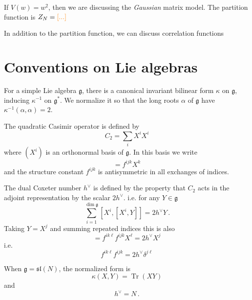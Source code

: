 \documentclass[12pt,letterpaper,reqno]{amsart}
\numberwithin{equation}{section}
\newcommand{\fg}{{\mathfrak g}}
\newcommand{\fsl}{{\mathfrak {sl}}}
\newcommand{\ti}[1]{\textit{#1}}
\DeclareMathOperator{\Tr}{Tr}
\DeclareRobustCommand{\fixme}[1]{\leavevmode{\color{orange}[#1]}}
\begin{document}
\begin{example} If $V(w) = w^2$, then we are discussing the \ti{Gaussian} matrix model.
The partition function is $Z_N = \fixme{...}$
\end{example}

In addition to the partition function, we can discuss correlation functions \fixme{...}

\appendix


\section{Conventions on Lie algebras} \label{sec:lie-conventions}

For a simple Lie algebra $\fg$,
there is a canonical invariant bilinear form
$\kappa$ on $\fg$, inducing $\kappa^{-1}$ on $\fg^*$. 
We normalize it so that the long roots $\alpha$ of $\fg$
have $\kappa^{-1}(\alpha,\alpha) = 2$.

The quadratic Casimir operator is defined by 
\begin{equation}
  C_2 = \sum_i X^i X^i
\end{equation}
where $(X^i)$ is an orthonormal basis of $\fg$.
In this basis we write 
\begin{equation}
  [X^i, X^j] = f^{ijk} X^k
\end{equation}
and the structure constant $f^{ijk}$ is antisymmetric in all exchanges of indices.

The dual Coxeter number $h^\vee$ is defined by the property that
$C_2$ acts in the adjoint representation by the scalar $2 h^\vee$.
i.e. for any $Y \in \fg$
\begin{equation}
  \sum_{i=1}^{\dim \fg} [X^i, [X^i, Y]] = 2 h^\vee Y \, .
\end{equation}
Taking $Y = X^j$ and summing repeated indices this is also
\begin{equation}
  [X^i, f^{ijk} X^k] = f^{ik\ell} f^{ijk} X^\ell = 2 h^\vee X^j
\end{equation}
i.e.
\begin{equation} \label{eq:f-coxeter}
  f^{ik\ell} f^{ijk} = 2 h^\vee \delta^{j \ell}
\end{equation}

When $\fg = \fsl(N)$, the normalized form is
\begin{equation}
  \kappa(X,Y) = \Tr (XY)
\end{equation}
and
\begin{equation}
  h^\vee = N \, .
\end{equation}
\end{document}
